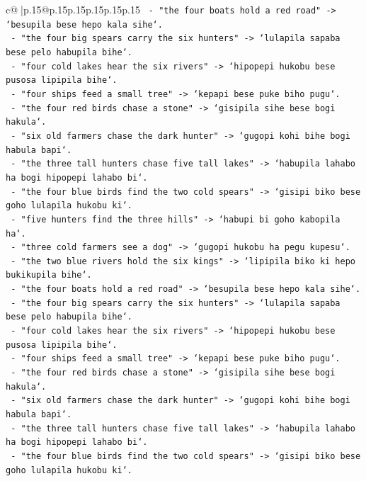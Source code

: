 \documentclass{article}
\begin{document}
{\begin{supertabular}{c@{$\;$}|p{.15\linewidth}@{}p{.15\linewidth}p{.15\linewidth}p{.15\linewidth}p{.15\linewidth}p{.15\linewidth}}
{{{\texttt{  {-} "the four boats hold a red road" {-}> `besupila bese hepo kala sihe`.} \\
\texttt{  {-} "the four big spears carry the six hunters" {-}> `lulapila sapaba bese pelo habupila bihe`.} \\
\texttt{  {-} "four cold lakes hear the six rivers" {-}> `hipopepi hukobu bese pusosa lipipila bihe`.} \\
\texttt{  {-} "four ships feed a small tree" {-}> `kepapi bese puke biho pugu`.} \\
\texttt{  {-} "the four red birds chase a stone" {-}> `gisipila sihe bese bogi hakula`.} \\
\texttt{  {-} "six old farmers chase the dark hunter" {-}> `gugopi kohi bihe bogi habula bapi`.} \\
\texttt{  {-} "the three tall hunters chase five tall lakes" {-}> `habupila lahabo ha bogi hipopepi lahabo bi`.} \\
\texttt{  {-} "the four blue birds find the two cold spears" {-}> `gisipi biko bese goho lulapila hukobu ki`.} \\
\texttt{  {-} "five hunters find the three hills" {-}> `habupi bi goho kabopila ha`.} \\
\texttt{  {-} "three cold farmers see a dog" {-}> `gugopi hukobu ha pegu kupesu`.} \\
\texttt{  {-} "the two blue rivers hold the six kings" {-}> `lipipila biko ki hepo bukikupila bihe`.} \\
\texttt{  {-} "the four boats hold a red road" {-}> `besupila bese hepo kala sihe`.} \\
\texttt{  {-} "the four big spears carry the six hunters" {-}> `lulapila sapaba bese pelo habupila bihe`.} \\
\texttt{  {-} "four cold lakes hear the six rivers" {-}> `hipopepi hukobu bese pusosa lipipila bihe`.} \\
\texttt{  {-} "four ships feed a small tree" {-}> `kepapi bese puke biho pugu`.} \\
\texttt{  {-} "the four red birds chase a stone" {-}> `gisipila sihe bese bogi hakula`.} \\
\texttt{  {-} "six old farmers chase the dark hunter" {-}> `gugopi kohi bihe bogi habula bapi`.} \\
\texttt{  {-} "the three tall hunters chase five tall lakes" {-}> `habupila lahabo ha bogi hipopepi lahabo bi`.} \\
\texttt{  {-} "the four blue birds find the two cold spears" {-}> `gisipi biko bese goho lulapila hukobu ki`.} \\
}}}
\end{supertabular}}
\end{document}
